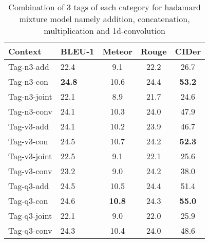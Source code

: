 \documentclass[11pt,a4paper]{article}
\begin{document}
\begin{table}[ht]
\scriptsize
\centering
\begin{tabular}{|l|l|c  c c|}
\hline \bf Context & \bf BLEU-1 & \bf Meteor & \bf Rouge & \bf CIDer \\ \hline 


Tag-n3-add & 22.4 &9.1& 22.2 &26.7\\
Tag-n3-con  &\textbf{24.8}&10.6& 24.4 & \bf53.2\\
Tag-n3-joint& 22.1&8.9&21.7 & 24.6\\
Tag-n3-conv  &24.1&10.3&24.0&47.9\\\hline


Tag-v3-add  &24.1 &10.2& 23.9  &46.7 \\
Tag-v3-con  &24.5 &10.7&24.2 &\bf52.3 \\
Tag-v3-joint  & 22.5&9.1&22.1& 25.6\\
Tag-v3-conv  & 23.2&9.0&24.2 &38.0 \\\hline


Tag-q3-add  & 24.5 &10.5& 24.4 &{51.4}\\
Tag-q3-con  & 24.6 &\textbf{10.8}& 24.3 & \textbf{55.0}\\
Tag-q3-joint  & 22.1 &9.0& 22.0 &25.9\\
Tag-q3-conv  &24.3 &10.4&24.0 &48.6\\\hline
\end{tabular}
\caption{\label{score_tab_9}Combination of 3 tags of each category for hadamard mixture model namely addition, concatenation, multiplication and 1d-convolution}
\end{table}
\end{document}
